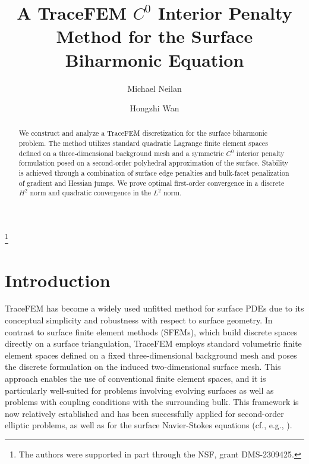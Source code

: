 \documentclass[10pt, a4paper]{amsart}
\theoremstyle{definition}
\theoremstyle{remark}
\theoremstyle{example}
\numberwithin{equation}{section}
\begin{document}
\parindent=0in

\title[A TraceFEM $C^0$ IP Method for the Surface Biharmonic]{A TraceFEM $C^0$ Interior Penalty Method for the Surface Biharmonic Equation}


\author[M.~Neilan]{Michael Neilan}
\address{Department of Mathematics, University of Pittsburgh, Pittsburgh, PA 15260 USA}

\author[H.~Wan]{Hongzhi Wan}
\address{Department of Mathematics, University of Pittsburgh, Pittsburgh, PA 15260 USA}

\thanks{The authors were supported in part through the NSF, grant DMS-2309425.}
\date{}
\maketitle

\begin{abstract}
We construct and analyze a  TraceFEM discretization for the surface biharmonic problem.
The method utilizes standard quadratic Lagrange finite element spaces defined on a three-dimensional background mesh and a symmetric $C^0$ interior penalty formulation posed on a second-order polyhedral approximation of the surface.
Stability is achieved through a combination of surface edge penalties and bulk-facet penalization of gradient and Hessian jumps. 
We prove optimal first-order convergence in a discrete $H^2$ norm
and quadratic convergence in the $L^2$ norm. 
\end{abstract}

\thispagestyle{empty}

\section{Introduction}






TraceFEM has become a widely used unfitted 
    method for surface PDEs due to its conceptual simplicity
    and robustness with respect to surface geometry. 
    In contrast to surface finite element methods (SFEMs), which 
    build discrete spaces directly on a surface triangulation, TraceFEM
    employs standard volumetric finite element spaces defined on a fixed
    three-dimensional background mesh and poses the discrete formulation
on the induced two-dimensional surface mesh.
    This approach enables
the use of conventional finite element spaces, and it is particularly well-suited
for problems involving evolving surfaces as well as problems with coupling conditions
with the surrounding bulk. This framework is now relatively established and has been 
successfully applied for second-order  elliptic problems, as well
as for the surface Navier-Stokes equations (cf., e.g., \cite{OlshanskiiEtal09,OlshanskiiEtal24,BurmanEtal15,LarsonZahedi20}).
\end{document}
